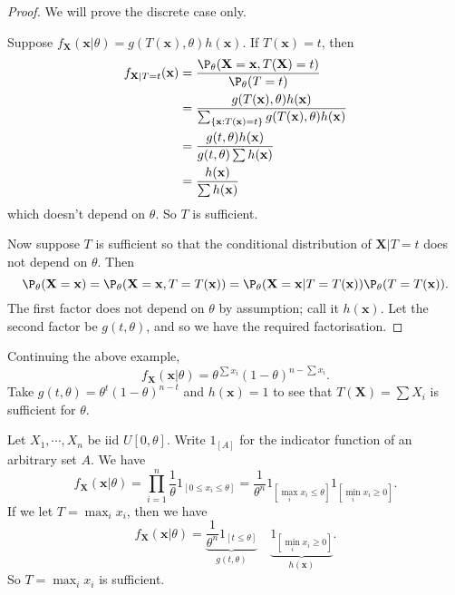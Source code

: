 \documentclass[a4paper]{article}
\begin{document}
\begin{proof}
  We will prove the discrete case only.

  Suppose $f_\mathbf{X}(\mathbf{x}|\theta) = g(T(\mathbf{x}), \theta)h(\mathbf{x})$. If $T(\mathbf{x}) = t$, then
  \begin{align*}
    f_{\mathbf{X}|T = t}(\mathbf{x}) &= \frac{\P_\theta(\mathbf{X} = \mathbf{x}, T(\mathbf{X}) = t)}{\P_\theta (T = t)}\\
    &= \frac{g(T(\mathbf{x}), \theta)h(\mathbf{x})}{\sum_{\{\mathbf{x}:T(\mathbf{x}) = t\}}g(T(\mathbf{x}), \theta)h(\mathbf{x})}\\
    &=\frac{g(t, \theta)h(\mathbf{x})}{g(t, \theta)\sum h(\mathbf{x})}\\
    &= \frac{h(\mathbf{x})}{\sum h(\mathbf{x})}
  \end{align*}
  which doesn't depend on $\theta$. So $T$ is sufficient.

  Now suppose $T$ is sufficient so that the conditional distribution of $\mathbf{X}|T = t$ does not depend on $\theta$. Then
  \[
    \P_\theta(\mathbf{X} = \mathbf{x}) = \P_\theta(\mathbf{X} = \mathbf{x}, T=T(\mathbf{x})) = \P_\theta(\mathbf{X} = \mathbf{x}|T = T(\mathbf{x}))\P_\theta (T = T(\mathbf{x})).
  \]
  The first factor does not depend on $\theta$ by assumption; call it $h(\mathbf{x})$. Let the second factor be $g(t, \theta)$, and so we have the required factorisation.
\end{proof}

\begin{eg}
  Continuing the above example,
  \[
    f_\mathbf{X}(\mathbf{x}|\theta) = \theta^{\sum x_i}(1 - \theta)^{n - \sum x_i}.
  \]
  Take $g(t, \theta) = \theta^t(1 - \theta)^{n - t}$ and $h(\mathbf{x}) = 1$ to see that $T(\mathbf{X}) = \sum X_i$ is sufficient for $\theta$.
\end{eg}

\begin{eg}
  Let $X_1, \cdots, X_n$ be iid $U[0, \theta]$. Write $1_{[A]}$ for the indicator function of an arbitrary set $A$. We have
  \[
    f_\mathbf{X}(\mathbf{x}|\theta) = \prod_{i = 1}^n \frac{1}{\theta}1_{[0 \leq x_i\leq \theta]} = \frac{1}{\theta^n}1_{[\max_i x_i \leq \theta]}1_{[\min_i x_i\geq 0]}.
  \]
  If we let $T = \max_i x_i$, then we have
  \[
    f_\mathbf{X}(\mathbf{x}|\theta) = \underbrace{\frac{1}{\theta^n}1_{[t \leq \theta]}}_{g(t, \theta)}\quad \underbrace{1_{[\min_i x_i \geq 0]}}_{h(\mathbf{x})}.
  \]
  So $T = \max_i x_i$ is sufficient.
\end{eg}
\end{document}
